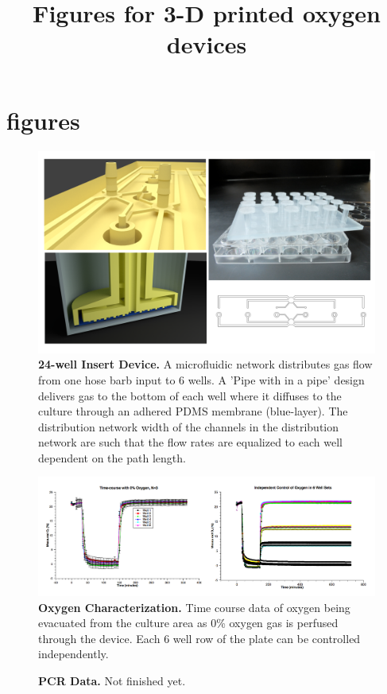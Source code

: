 \documentclass[]{article}
\title{Figures for  3-D printed oxygen devices}
\author{}
\begin{document}

\section{figures}

\begin{figure}[H]
\includegraphics[scale=0.2]{fig1.png} 
\caption{
{\bf 24-well Insert Device.} A microfluidic network distributes gas flow from one hose barb input to 6 wells.
A 'Pipe with in a pipe' design delivers gas to the bottom of each well where it diffuses to the culture through an adhered PDMS membrane (blue-layer).  
The distribution network width of the channels in the distribution network are such that the flow rates are equalized to each well dependent on the path length.
}
\label{figure1}
\end{figure}

\begin{figure}[H]
\includegraphics[scale=0.25]{fig2.png}
\caption{
{\bf Oxygen Characterization.}  Time course data of oxygen being evacuated from the culture area as 0\% oxygen gas is perfused through the device. Each 6 well row of the plate can be controlled independently.  
}
\label{figure2}
\end{figure}

\begin{figure}[H]
\caption{
{\bf PCR Data.}  Not finished yet.  
}
\label{pcr-data}
\end{figure}



\end{document}
